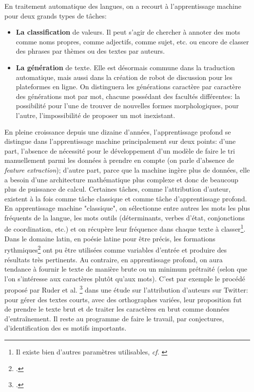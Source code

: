 En traitement automatique des langues, on a recourt à l'apprentissage machine pour deux grands types de tâches:
\begin{itemize}
    \item \textbf{La classification} de valeurs. Il peut s'agir de chercher à annoter des mots comme noms propres, comme adjectifs, comme sujet, etc. ou encore de classer des phrases par thèmes ou des textes par auteurs.
    \item \textbf{La génération} de texte. Elle est désormais commune dans la traduction automatique, mais aussi dans la création de robot de discussion pour les plateformes en ligne. On distinguera les générations caractère par caractère des générations mot par mot, chacune possédant des facultés différentes: la possibilité pour l'une de trouver de nouvelles formes morphologiques, pour l'autre, l'impossibilité de proposer un mot inexistant.
\end{itemize}{}

En pleine croissance depuis une dizaine d'années, l'apprentissage profond se distingue dans l'apprentissage machine principalement sur deux points: d'une part, l'absence de nécessité pour le développement d'un modèle de faire le tri manuellement parmi les données à prendre en compte (on parle d'absence de \textit{feature extraction}); d'autre part, parce que la machine ingère plus de données, elle a besoin d'une architecture mathématique plus complexe et donc de beaucoup plus de puissance de calcul. Certaines tâches, comme l'attribution d'auteur, existent à la fois comme tâche classique et comme tâche d'apprentissage profond. En apprentissage machine "classique", on sélectionne entre autres les mots les plus fréquents de la langue, les mots outils (déterminants, verbes d'état, conjonctions de coordination, etc.) et on récupère leur fréquence dans chaque texte à classer\footnote{Il existe bien d'autres paramètres utilisables, \textit{cf.} \cite{Cafieroeaax5489}}. Dans le domaine latin, en poésie latine pour être précis, les formations rythmiques\footcite{nagy_metre_nodate} ont pu être utilisées comme variables d'entrée et produire des résultats très pertinents. Au contraire, en apprentissage profond, on aura tendance à fournir le texte de manière brute ou un minimum prétraité (selon que l'on s'intéresse aux caractères plutôt qu'aux mots). C'est par exemple le procédé proposé par Ruder et al. \footcite{ruder_character-level_2016} dans une étude sur l'attribution d'auteurs sur Twitter: pour gérer des textes courts, avec des orthographes variées, leur proposition fut de prendre le texte brut et de traiter les caractères en brut comme données d'entraînement. Il reste au programme de faire le travail, par conjectures, d'identification des es motifs importants.

